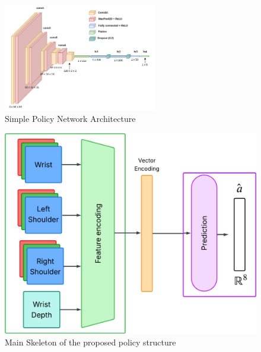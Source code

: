 \begin{figure}[h]
  \centering
  \includegraphics[width=0.6\textwidth]{assets/early-work/cnn-encoder-policy-head.png}
  \caption{Simple Policy Network Architecture}\label{fig:policy-arch}
\end{figure}

\begin{figure}[htpb]
  \centering
  \includegraphics[width=0.7\linewidth]{assets/cam-comb/policies/general-diagram.png}
  \caption{Main Skeleton of the proposed policy structure}\label{fig:policies-skeleton-idea}
\end{figure}